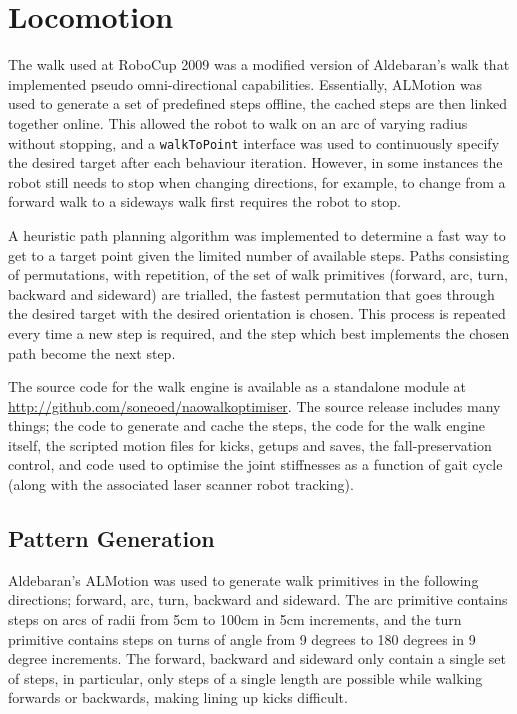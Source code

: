 \section{Locomotion}

The walk used at RoboCup 2009 was a modified version of Aldebaran's walk that implemented pseudo omni-directional capabilities. Essentially, ALMotion was used to generate a set of predefined steps offline, the cached steps are then linked together online. This allowed the robot to walk on an arc of varying radius without stopping, and a \texttt{walkToPoint} interface was used to continuously specify the desired target after each behaviour iteration. However, in some instances the robot still needs to stop when changing directions, for example, to change from a forward walk to a sideways walk first requires the robot to stop.

A heuristic path planning algorithm was implemented to determine a fast way to get to a target point given the limited number of available steps. Paths consisting of permutations, with repetition, of the set of walk primitives (forward, arc, turn, backward and sideward) are trialled, the fastest permutation that goes through the desired target with the desired orientation is chosen. This process is repeated every time a new step is required, and the step which best implements the chosen path become the next step.

The source code for the walk engine is available as a standalone module at \href{http://github.com/soneoed/naowalkoptimiser}{http://github.com/soneoed/naowalkoptimiser}. The source release includes many things; the code to generate and cache the steps, the code for the walk engine itself, the scripted motion files for kicks, getups and saves, the fall-preservation control, and code used to optimise the joint stiffnesses as a function of gait cycle (along with the associated laser scanner robot tracking).

\subsection{Pattern Generation}

Aldebaran's ALMotion was used to generate walk primitives in the following directions; forward, arc, turn, backward and sideward. The arc primitive contains steps on arcs of radii from 5cm to 100cm in 5cm increments, and the turn primitive contains steps on turns of angle from 9 degrees to 180 degrees in 9 degree increments. The forward, backward and sideward only contain a single set of steps, in particular, only steps of a single length are possible while walking forwards or backwards, making lining up kicks difficult.

